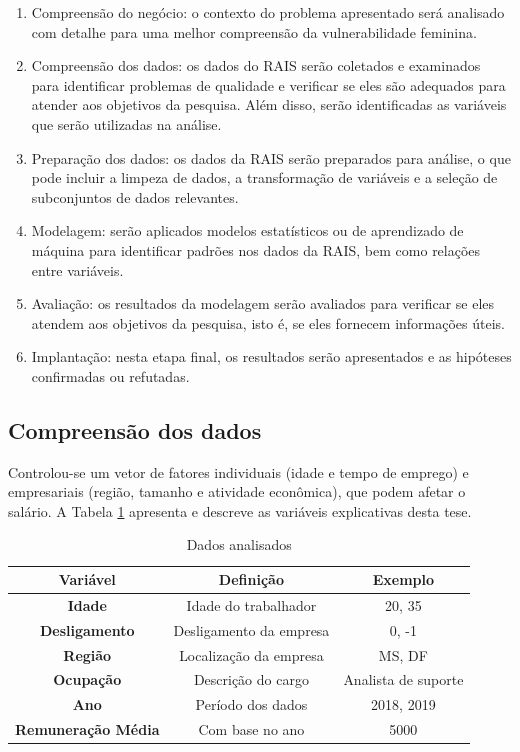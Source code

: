 \begin{enumerate}
	\item Compreensão do negócio: o contexto do problema apresentado será analisado com detalhe para uma melhor compreensão da vulnerabilidade feminina.
	\item Compreensão dos dados: os dados do RAIS serão coletados e examinados para identificar problemas de qualidade e verificar se eles são adequados para atender aos objetivos da pesquisa. Além disso, serão identificadas as variáveis que serão utilizadas na análise.
	\item Preparação dos dados: os dados da RAIS serão preparados para análise, o que pode incluir a limpeza de dados, a transformação de variáveis e a seleção de subconjuntos de dados relevantes. 
	\item Modelagem: serão aplicados modelos estatísticos ou de aprendizado de máquina para identificar padrões nos dados da RAIS, bem como relações entre variáveis.
	\item Avaliação: os resultados da modelagem serão avaliados para verificar se eles atendem aos objetivos da pesquisa, isto é, se eles fornecem informações úteis.
	\item Implantação: nesta etapa final, os resultados serão apresentados e as hipóteses confirmadas ou refutadas.     	      	      	      	      	      
\end{enumerate}


\subsection{Compreensão dos dados}

Controlou-se um vetor de fatores individuais (idade e tempo de emprego) e empresariais
(região, tamanho e atividade econômica), que podem afetar o salário. A Tabela \ref{vars} apresenta e
descreve as variáveis explicativas desta tese.

\begin{table}[htbp]
	\caption{Dados analisados}
	\begin{center}
		\begin{tabular}{|c|c|c|}
			\hline
			\textbf{Variável}            & \textbf{Definição}     & \textbf{Exemplo}    \\ 
			\hline
			\textbf{Idade}                & Idade do trabalhador     & 20, 35              \\
			\hline 
			\textbf{Desligamento}         & Desligamento da empresa  & 0, -1               \\
			\hline 
			\textbf{Região}              & Localização da empresa & MS, DF              \\
			\hline 
			\textbf{Ocupação}           & Descrição do cargo     & Analista de suporte \\
			\hline 
			\textbf{Ano}                  & Período dos dados       & 2018, 2019          \\
			\hline
			\textbf{Remuneração Média} & Com base no ano          & 5000                \\
			\hline
		\end{tabular}
		\label{vars}
	\end{center}
\end{table}

